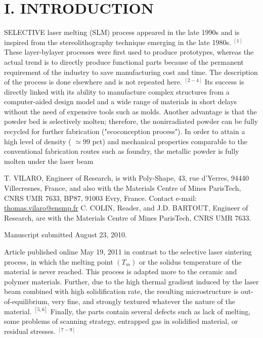\documentclass[10pt]{article}
\begin{document}
\section*{I. INTRODUCTION}
SELECTIVE laser melting (SLM) process appeared in the late 1990s and is inspired from the stereolithography technique emerging in the late 1980s. ${ }^{[1]}$ These layer-bylayer processes were first used to produce prototypes, whereas the actual trend is to directly produce functional parts because of the permanent requirement of the industry to save manufacturing cost and time. The description of the process is done elsewhere and is not repeated here. ${ }^{[2-4]}$ Its success is directly linked with its ability to manufacture complex structures from a computer-aided design model and a wide range of materials in short delays without the need of expensive tools such as molds. Another advantage is that the powder bed is selectively molten; therefore, the nonirradiated powder can be fully recycled for further fabrication ("ecoconception process"). In order to attain a high level of density ( $\simeq 99$ pct) and mechanical properties comparable to the conventional fabrication routes such as foundry, the metallic powder is fully molten under the laser beam

T. VILARO, Engineer of Research, is with Poly-Shape, 43, rue d'Yerres, 94440 Villecresnes, France, and also with the Materials Centre of Mines ParisTech, CNRS UMR 7633, BP87, 91003 Evry, France. Contact e-mail: \href{mailto:thomas.vilaro@ensmp.fr}{thomas.vilaro@ensmp.fr} C. COLIN, Reader, and J.D. BARTOUT, Engineer of Research, are with the Materials Centre of Mines ParisTech, CNRS UMR 7633.

Manuscript submitted August 23, 2010.

Article published online May 19, 2011 in contrast to the selective laser sintering process, in which the melting point $\left(T_{m}\right)$ or the solidus temperature of the material is never reached. This process is adapted more to the ceramic and polymer materials. Further, due to the high thermal gradient induced by the laser beam combined with high solidification rate, the resulting microstructure is out-of-equilibrium, very fine, and strongly textured whatever the nature of the material. ${ }^{[5,6]}$ Finally, the parts contain several defects such as lack of melting, some problems of scanning strategy, entrapped gas in solidified material, or residual stresses. ${ }^{[7-9]}$
\end{document}
